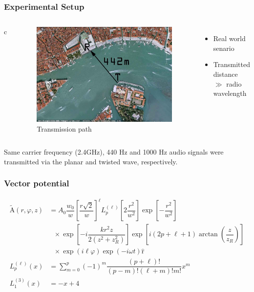 \documentclass[xcolor=dvipsnames]{beamer}
\newenvironment{items}[1][]
{\begin{itemize}
    \ifthenelse{\isempty{#1}}
    {\setlength{\itemsep}{12pt}}{\setlength{\itemsep}{#1}}}
  {\end{itemize}}
\newcommand{\f}[2]{\dfrac{#1}{#2}} %
\newcommand{\p}[1]{\left(#1\right)} %
\renewcommand{\sp}[1]{\left[#1\right]} %
\renewcommand{\phi}{\varphi} %
\renewcommand{\v}[1]{\boldsymbol{\mathrm{#1}}} %
\newcommand{\uv}[1]{\hat{\boldsymbol{\mathrm{#1}}}} %
\newcommand{\cxv}[1]{\v{\widetilde{#1}}} %
\begin{document}
\begin{frame}
	\frametitle{Experimental Setup}
  \begin{columns}{c}
		\begin{figure}
      \includegraphics[width=\textwidth]{birdeyeview}
      \caption{Transmission path}
      \label{pic:birdeye}
		\end{figure}
		\begin{items}
		\item Real world senario
		\item Transmitted distance $\gg$ radio wavelength
		\end{items}
  \end{columns}
\end{frame}
\begin{frame}
  Same carrier frequency (2.4GHz), 440 Hz and 1000 Hz audio signals
  were transmitted via the planar and twisted wave, respectively.
\end{frame}

\begin{frame}
  \frametitle{Vector potential}
  \begin{align*}
    {\cxv A}\p{r,\phi,z}&=A_0\f{w_0}{w}\sp{\f{r\sqrt 2}{w}}^\ell
    L^{\p{\ell}}_p\sp{2\f{r^2}{w^2}}\exp\sp{-\f{r^2}{w^2}} \\
    &~~~\times\exp\sp{-i\f{kr^2z}{2\p{z^2+z_R^2}}}
    \exp\sp{i\p{2p+\ell+1}\arctan\p{\f z{z_R}}} \\
    &~~~\times\exp\p{i\ell\phi}\exp\p{-i\omega t} \uv r \\
    L^{\p{\ell}}_p\p{x}
    &=\sum_{m=0}^p\p{-1}^m\f{\p{p+\ell}!}{\p{p-m}!\p{\ell+m}!m!}x^m \\
    L^{\p{3}}_1\p{x}&=-x+4
  \end{align*}
\end{frame}
\end{document}
